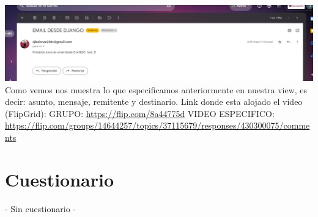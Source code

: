 \documentclass{article}
\begin{document}
        \includegraphics[width=16cm]{img/email recibido.png}
        \newline Como vemos nos muestra lo que especificamos anteriormente en nuestra view, es decir: asunto, mensaje, remitente y destinario.
        \newline
        \newline\newline 
        Link donde esta alojado el video (FlipGrid):\newline
        GRUPO:
        \url{https://flip.com/8a44775d}\newline
        VIDEO ESPECIFICO:
        \url{https://flip.com/groups/14644257/topics/37115679/responses/430300075/comments}
        
\section{Cuestionario}
	- Sin cuestionario -	
 \newpage
\end{document}
